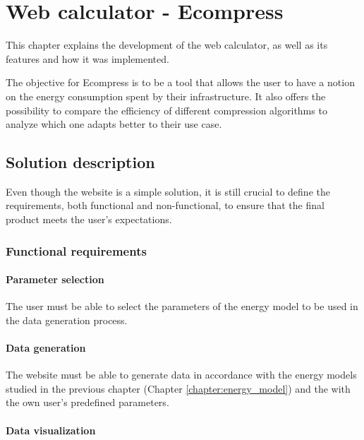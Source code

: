 \chapter{Web calculator - Ecompress}
\label{chapter:web_calculator}

\begin{introduction}
    This chapter explains the development of the web calculator, as well as its features and how it was implemented.

    The objective for Ecompress is to be a tool that allows the user to have a notion on the energy consumption spent by their infrastructure. It also offers the possibility to compare the efficiency of different compression algorithms to analyze which one adapts better to their use case.
\end{introduction}

\section{Solution description}

Even though the website is a simple solution, it is still crucial to define the requirements, both functional and non-functional, to ensure that the final product meets the user's expectations. 

\subsection{Functional requirements}

    \subsubsection{Parameter selection}

        The user must be able to select the parameters of the energy model to be used in the data generation process.

    \subsubsection{Data generation}

        The website must be able to generate data in accordance with the energy models studied in the previous chapter (Chapter \ref{chapter:energy_model}) and the with the own user's predefined parameters.
    
    \subsubsection{Data visualization}

